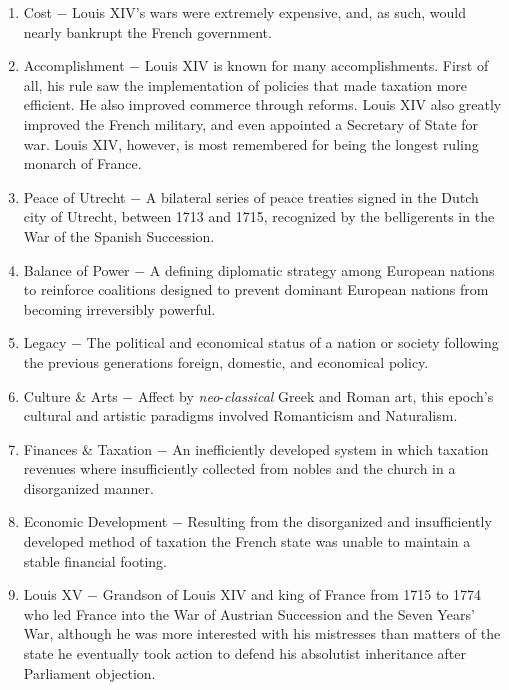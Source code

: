 \documentclass[12pt]{article}
\begin{document}
\begin{enumerate}
\item Cost $-$ Louis XIV's wars were extremely expensive, and, as such, would nearly bankrupt the French government.

\item Accomplishment $-$ Louis XIV is known for many accomplishments. First of all, his rule saw the implementation of policies that made taxation more efficient. He also improved commerce through reforms. Louis XIV also greatly improved the French military, and even appointed a Secretary of State for war. Louis XIV, however, is most remembered for being the longest ruling monarch of France.

\item Peace of Utrecht $-$ A bilateral series of peace treaties signed in the Dutch city of Utrecht, between 1713 and 1715, recognized by the belligerents in the War of the Spanish Succession.

\item Balance of Power $-$ A defining diplomatic strategy among European nations to reinforce coalitions designed to prevent dominant European nations from becoming irreversibly powerful.

\item Legacy $-$ The political and economical status of a nation or society following the previous generations foreign, domestic, and economical policy.

\item Culture \& Arts $-$ Affect by \textit{neo}-\textit{classical} Greek and Roman art, this epoch's cultural and artistic paradigms involved Romanticism and Naturalism.

\item Finances \& Taxation $-$ An inefficiently developed system in which taxation revenues where insufficiently collected from nobles and the church in a disorganized manner.

\item Economic Development $-$ Resulting from the disorganized and insufficiently developed method of taxation the French state was unable to maintain a stable financial footing.

\item Louis XV $-$ Grandson of Louis XIV and king of France from 1715 to 1774 who led France into the War of Austrian Succession and the Seven Years' War, although he was more interested with his mistresses than matters of the state he eventually took action to defend his absolutist inheritance after Parliament objection. 


\end{enumerate}
\end{document}
